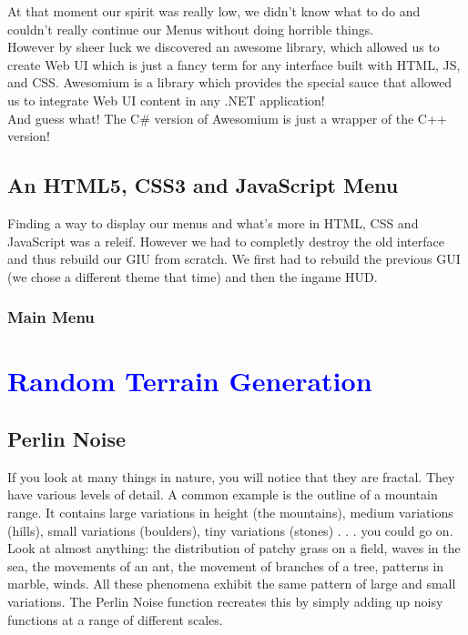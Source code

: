 \documentclass[article]{report}         %
\begin{document}
        At that moment our spirit was really low, we didn't know what to do and couldn't really continue our Menus without doing horrible things.\\
        However by sheer luck we discovered an awesome library, which allowed us to create Web UI which is just a fancy term for any interface built with HTML, JS, and CSS.
        Awesomium is a library which provides the special sauce that allowed us to integrate Web UI content in any .NET application! \\
        And guess what! The C\# version of Awesomium is just a wrapper of the C++ version!

      \section{An HTML5, CSS3 and JavaScript Menu}
        Finding a way to display our menus and what's more in HTML, CSS and JavaScript was a releif. However we had to completly destroy the old interface and thus rebuild our GIU from scratch. We first had to rebuild the previous GUI (we chose a different theme that time) and then the ingame HUD.

        \subsection{Main Menu}


		\chapter{\textcolor{blue}{Random Terrain Generation}}
      \section{Perlin Noise}
        If you look at many things in nature, you will notice that they are fractal. They have various levels of detail. A common example is the outline of a mountain range. It contains large variations in height (the mountains), medium variations (hills), small variations (boulders), tiny variations (stones) . . . you could go on.\\
        Look at almost anything: the distribution of patchy grass on a field, waves in the sea, the movements of an ant, the movement of branches of a tree, patterns in marble, winds. All these phenomena exhibit the same pattern of large and small variations. The Perlin Noise function recreates this by simply adding up noisy functions at a range of different scales.\\
\end{document}
